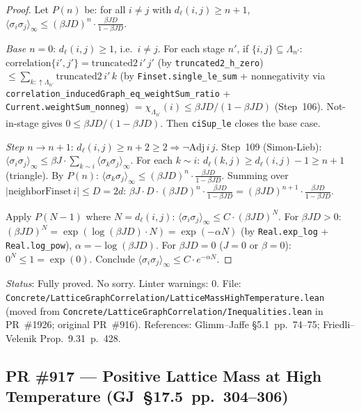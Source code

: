 \documentclass[a4paper,11pt]{article}
\begin{document}
\begin{proof}
Let $P(n)$ be: for all $i\ne j$ with $d_\ell(i,j)\ge n+1$,
$\langle\sigma_i\sigma_j\rangle_\infty\le(\beta J D)^n\cdot\frac{\beta J D}{1-\beta J D}$.

\textit{Base $n=0$}: $d_\ell(i,j)\ge 1$, i.e.\ $i\ne j$.
For each stage $n'$, if $\{i,j\}\subseteq\Lambda_{n'}$:
$\mathrm{correlation}\{i',j'\}
=\mathrm{truncated2}\,i'\,j'$
(by \texttt{truncated2\_h\_zero})
$\le\sum_{k:\uparrow\Lambda_{n'}}\mathrm{truncated2}\,i'\,k$
(by \texttt{Finset.single\_le\_sum} + nonnegativity via
\texttt{correlation\_inducedGraph\_eq\_weightSum\_ratio} + \texttt{Current.weightSum\_nonneg})
$=\chi_{\Lambda_{n'}}(i)
\le\beta J D/(1-\beta J D)$ (Step~106).
Not-in-stage gives $0\le\beta J D/(1-\beta J D)$.
Then \texttt{ciSup\_le} closes the base case.

\textit{Step $n\to n+1$}: $d_\ell(i,j)\ge n+2\ge 2\Rightarrow\neg\mathrm{Adj}\,i\,j$.
Step~109 (Simon-Lieb): $\langle\sigma_i\sigma_j\rangle_\infty\le\beta J\cdot\sum_{k\sim i}\langle\sigma_k\sigma_j\rangle_\infty$.
For each $k\sim i$: $d_\ell(k,j)\ge d_\ell(i,j)-1\ge n+1$ (triangle).
By $P(n)$: $\langle\sigma_k\sigma_j\rangle_\infty\le(\beta J D)^n\cdot\frac{\beta J D}{1-\beta J D}$.
Summing over $|\mathrm{neighborFinset}\,i|\le D=2d$:
$\beta J\cdot D\cdot(\beta J D)^n\cdot\frac{\beta J D}{1-\beta J D}
=(\beta J D)^{n+1}\cdot\frac{\beta J D}{1-\beta J D}$.

Apply $P(N-1)$ where $N=d_\ell(i,j)$:
$\langle\sigma_i\sigma_j\rangle_\infty\le C\cdot(\beta J D)^N$.
For $\beta J D>0$: $(\beta J D)^N=\exp(\log(\beta J D)\cdot N)=\exp(-\alpha N)$
(by \texttt{Real.exp\_log} + \texttt{Real.log\_pow}), $\alpha=-\log(\beta J D)$.
For $\beta J D=0$ ($J=0$ or $\beta=0$): $0^N\le 1=\exp(0)$.
Conclude $\langle\sigma_i\sigma_j\rangle_\infty\le C\cdot e^{-\alpha N}$.
\end{proof}

\noindent\textit{Status}: Fully proved. No sorry. Linter warnings: 0.
File: \texttt{Concrete/LatticeGraphCorrelation/LatticeMassHighTemperature.lean} (moved from \texttt{Concrete/LatticeGraphCorrelation/Inequalities.lean} in PR~\#1926; original PR~\#916).
References: Glimm--Jaffe \S5.1~pp.~74--75; Friedli--Velenik Prop.~9.31~p.~428.

\subsection*{PR \#917 --- Positive Lattice Mass at High Temperature
(GJ~\S17.5~pp.~304--306)}
\end{document}
